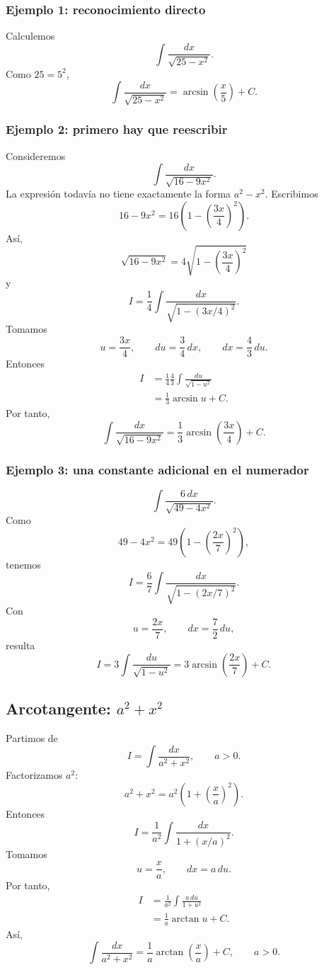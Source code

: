 \documentclass[12pt]{article}
\theoremstyle{definition}
\theoremstyle{remark}
\begin{document}
\subsubsection*{Ejemplo 1: reconocimiento directo}
Calculemos
\[
\int\frac{dx}{\sqrt{25-x^2}}.
\]
Como $25=5^2$,
\[
\int\frac{dx}{\sqrt{25-x^2}}
=\boxed{\arcsin\left(\frac{x}{5}\right)+C}.
\]

\subsubsection*{Ejemplo 2: primero hay que reescribir}
Consideremos
\[
\int\frac{dx}{\sqrt{16-9x^2}}.
\]
La expresión todavía no tiene exactamente la forma $a^2-x^2$. Escribimos
\[
16-9x^2=16\left(1-\left(\frac{3x}{4}\right)^2\right).
\]
Así,
\[
\sqrt{16-9x^2}=4\sqrt{1-\left(\frac{3x}{4}\right)^2}
\]
y
\[
I=\frac14\int\frac{dx}{\sqrt{1-(3x/4)^2}}.
\]
Tomamos
\[
u=\frac{3x}{4},\qquad du=\frac34\,dx,
\qquad dx=\frac43\,du.
\]
Entonces
\begin{align*}
I
&=\frac14\frac43\int\frac{du}{\sqrt{1-u^2}}\\
&=\frac13\arcsin u+C.
\end{align*}
Por tanto,
\[
\boxed{\int\frac{dx}{\sqrt{16-9x^2}}
=\frac13\arcsin\left(\frac{3x}{4}\right)+C.}
\]

\subsubsection*{Ejemplo 3: una constante adicional en el numerador}
\[
\int\frac{6\,dx}{\sqrt{49-4x^2}}.
\]
Como
\[
49-4x^2=49\left(1-\left(\frac{2x}{7}\right)^2\right),
\]
tenemos
\[
I=\frac67\int\frac{dx}{\sqrt{1-(2x/7)^2}}.
\]
Con
\[
u=\frac{2x}{7},\qquad dx=\frac72\,du,
\]
resulta
\[
I=3\int\frac{du}{\sqrt{1-u^2}}
=\boxed{3\arcsin\left(\frac{2x}{7}\right)+C}.
\]

\subsection*{Arcotangente: \texorpdfstring{$a^2+x^2$}{a2+x2}}

Partimos de
\[
I=\int\frac{dx}{a^2+x^2},\qquad a>0.
\]
Factorizamos $a^2$:
\[
a^2+x^2=a^2\left(1+\left(\frac{x}{a}\right)^2\right).
\]
Entonces
\[
I=\frac1{a^2}\int
\frac{dx}{1+(x/a)^2}.
\]
Tomamos
\[
u=\frac{x}{a},\qquad dx=a\,du.
\]
Por tanto,
\begin{align*}
I
&=\frac1{a^2}\int\frac{a\,du}{1+u^2}\\
&=\frac1a\arctan u+C.
\end{align*}
Así,
\[
\boxed{\int\frac{dx}{a^2+x^2}
=\frac1a\arctan\left(\frac{x}{a}\right)+C,\qquad a>0.}
\]
\end{document}
